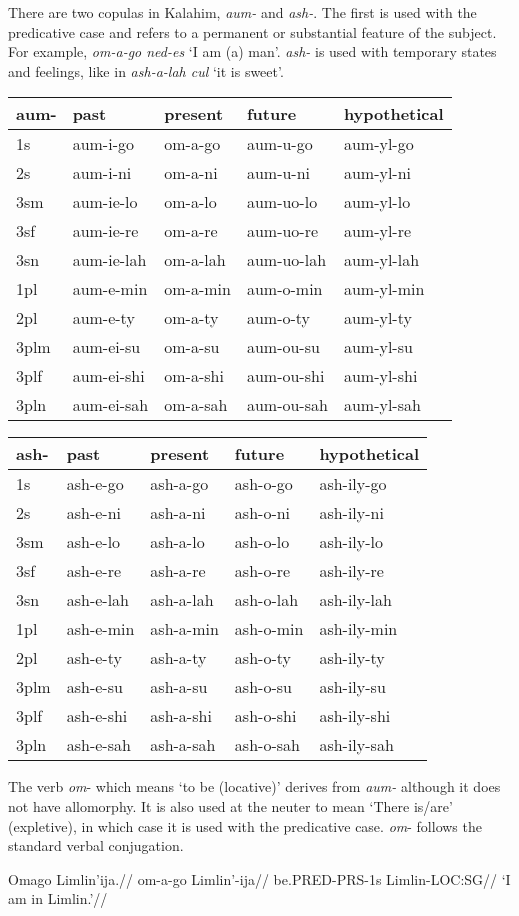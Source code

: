 \documentclass[a4paper,]{article}
\begin{document}
There are two copulas in Kalahim, \emph{aum-} and \emph{ash-}. The first
is used with the predicative case and refers to a permanent or
substantial feature of the subject. For example, \emph{om-a-go ned-es}
`I am (a) man'. \emph{ash-} is used with temporary states and feelings,
like in \emph{ash-a-lah cul} `it is sweet'.

\begin{longtable}[]{@{}lllll@{}}
\toprule
aum- & past & present & future & hypothetical\tabularnewline
\midrule
\endhead
1s & aum-i-go & om-a-go & aum-u-go & aum-yl-go\tabularnewline
2s & aum-i-ni & om-a-ni & aum-u-ni & aum-yl-ni\tabularnewline
3sm & aum-ie-lo & om-a-lo & aum-uo-lo & aum-yl-lo\tabularnewline
3sf & aum-ie-re & om-a-re & aum-uo-re & aum-yl-re\tabularnewline
3sn & aum-ie-lah & om-a-lah & aum-uo-lah & aum-yl-lah\tabularnewline
1pl & aum-e-min & om-a-min & aum-o-min & aum-yl-min\tabularnewline
2pl & aum-e-ty & om-a-ty & aum-o-ty & aum-yl-ty\tabularnewline
3plm & aum-ei-su & om-a-su & aum-ou-su & aum-yl-su\tabularnewline
3plf & aum-ei-shi & om-a-shi & aum-ou-shi & aum-yl-shi\tabularnewline
3pln & aum-ei-sah & om-a-sah & aum-ou-sah & aum-yl-sah\tabularnewline
\bottomrule
\end{longtable}

\begin{longtable}[]{@{}lllll@{}}
\toprule
ash- & past & present & future & hypothetical\tabularnewline
\midrule
\endhead
1s & ash-e-go & ash-a-go & ash-o-go & ash-ily-go\tabularnewline
2s & ash-e-ni & ash-a-ni & ash-o-ni & ash-ily-ni\tabularnewline
3sm & ash-e-lo & ash-a-lo & ash-o-lo & ash-ily-lo\tabularnewline
3sf & ash-e-re & ash-a-re & ash-o-re & ash-ily-re\tabularnewline
3sn & ash-e-lah & ash-a-lah & ash-o-lah & ash-ily-lah\tabularnewline
1pl & ash-e-min & ash-a-min & ash-o-min & ash-ily-min\tabularnewline
2pl & ash-e-ty & ash-a-ty & ash-o-ty & ash-ily-ty\tabularnewline
3plm & ash-e-su & ash-a-su & ash-o-su & ash-ily-su\tabularnewline
3plf & ash-e-shi & ash-a-shi & ash-o-shi & ash-ily-shi\tabularnewline
3pln & ash-e-sah & ash-a-sah & ash-o-sah & ash-ily-sah\tabularnewline
\bottomrule
\end{longtable}

The verb \emph{om}- which means `to be (locative)' derives from
\emph{aum-} although it does not have allomorphy. It is also used at the
neuter to mean `There is/are' (expletive), in which case it is used with
the predicative case. \emph{om}- follows the standard verbal
conjugation.

\ex \begingl \glpreamble Omago Limlin'ija.// \gla om-a-go Limlin'-ija//
\glb be.PRED-PRS-1s Limlin-LOC:SG// \glft `I am in Limlin.'// \endgl \xe
\end{document}
